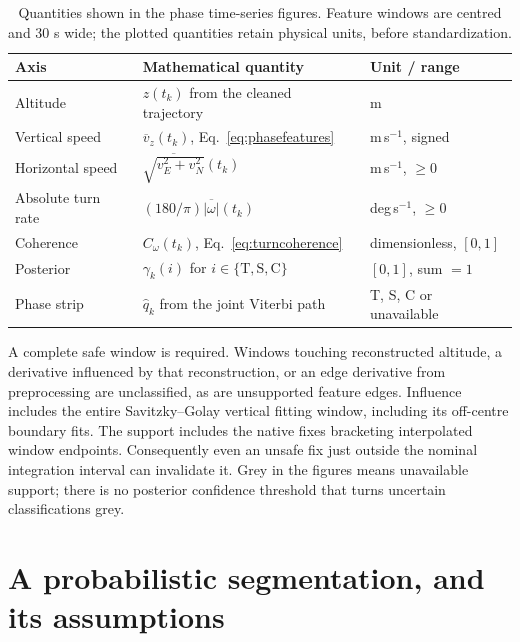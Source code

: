 \begin{table}[tb]
 \centering\small
 \caption{Quantities shown in the phase time-series figures. Feature windows are
 centred and 30 s wide; the plotted quantities retain physical units, before standardization.}
 \label{tab:phase-figure-quantities}
 \begin{tabularx}{\linewidth}{@{}lXl@{}}
 \toprule
 Axis & Mathematical quantity & Unit / range\\
 \midrule
 Altitude & $z(t_k)$ from the cleaned trajectory & m\\
 Vertical speed & $\overline v_z(t_k)$, Eq.~\eqref{eq:phasefeatures} & m\,s$^{-1}$, signed\\
 Horizontal speed & $\overline{\sqrt{v_E^2+v_N^2}}(t_k)$ & m\,s$^{-1}$, $\ge0$\\
 Absolute turn rate & $(180/\pi)\overline{|\omega|}(t_k)$ & deg\,s$^{-1}$, $\ge0$\\
 Coherence & $C_\omega(t_k)$, Eq.~\eqref{eq:turncoherence} & dimensionless, $[0,1]$\\
 Posterior & $\gamma_k(i)$ for $i\in\{\mathrm T,\mathrm S,\mathrm C\}$ & $[0,1]$, sum $=1$\\
 Phase strip & $\widehat q_k$ from the joint Viterbi path & T, S, C or unavailable\\
 \bottomrule
 \end{tabularx}
\end{table}

A complete safe window is required. Windows touching reconstructed altitude, a derivative influenced by that reconstruction,
or an edge derivative from preprocessing are unclassified, as are unsupported feature
edges. Influence includes the entire Savitzky--Golay vertical fitting window, including
its off-centre boundary fits.
The support includes the native fixes bracketing interpolated window endpoints.
Consequently even an unsafe fix just outside the nominal integration interval can
invalidate it. Grey in the figures means unavailable support; there is no posterior
confidence threshold that turns uncertain classifications grey.

\section{A probabilistic segmentation, and its assumptions}
\label{sec:gaussianhmm}
